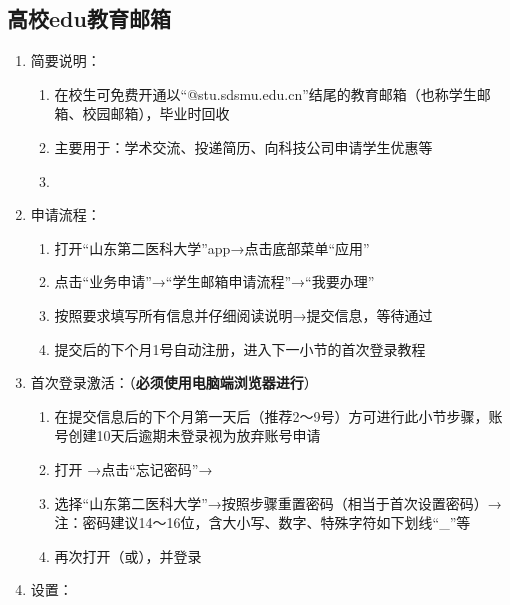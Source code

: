 \subsection[高校edu教育邮箱]{高校edu教育邮箱}
\label{email}
\begin{enumerate}
    \item 简要说明：
          \begin{enumerate}
              \item 在校生可免费开通以“@stu.sdsmu.edu.cn”结尾的教育邮箱（也称学生邮箱、校园邮箱），毕业时回收
              \item 主要用于：学术交流、投递简历、向科技公司申请学生优惠等
              \item {}
          \end{enumerate}
    \item 申请流程：
          \begin{enumerate}
              \item 打开“山东第二医科大学”app→点击底部菜单“应用”
              \item 点击“业务申请”→“学生邮箱申请流程”→“我要办理”
              \item 按照要求填写所有信息并仔细阅读说明→提交信息，等待通过
              \item 提交后的下个月1号自动注册，进入下一小节的首次登录教程
          \end{enumerate}
    \item 首次登录激活：（\textbf{必须使用电脑端浏览器进行}）
          \begin{enumerate}
              \item 在提交信息后的下个月第一天后（推荐2～9号）方可进行此小节步骤，账号创建10天后逾期未登录视为放弃账号申请
              \item 打开 →点击“忘记密码”→
              \item 选择“山东第二医科大学”→按照步骤重置密码（相当于首次设置密码）→\\
                    注：密码建议14～16位，含大小写、数字、特殊字符如下划线“\_”等
              \item 再次打开（或），并登录
          \end{enumerate}
    \item 设置：
          \begin{enumerate}

\end{enumerate}
\end{enumerate}
